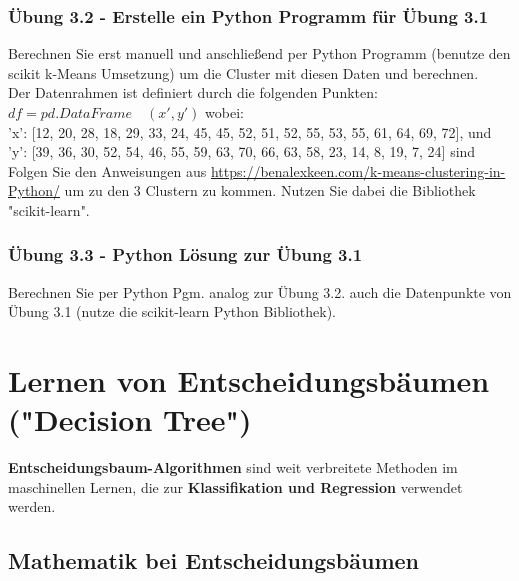 \documentclass[12pt]{article}
\begin{document}
\subsubsection{Übung 3.2 - Erstelle ein Python Programm für Übung 3.1}
Berechnen Sie erst manuell und anschließend per Python Programm (benutze den scikit k-Means Umsetzung) um die Cluster mit diesen Daten und berechnen. \\
Der Datenrahmen ist definiert durch die folgenden Punkten: \\
%
$ df = pd.DataFrame\quad(x', y') $ wobei:\\
'x': [12, 20, 28, 18, 29, 33, 24, 45, 45, 52, 51, 52, 55, 53, 55, 61, 64, 69, 72], und \\
'y': [39, 36, 30, 52, 54, 46, 55, 59, 63, 70, 66, 63, 58, 23, 14, 8, 19, 7, 24] sind \\[0.2cm]
Folgen Sie den Anweisungen aus \url{https://benalexkeen.com/k-means-clustering-in-Python/} um zu den 3 Clustern zu kommen. Nutzen Sie dabei die Bibliothek "scikit-learn". 

\subsubsection{Übung 3.3 - Python Lösung zur Übung 3.1}
Berechnen Sie per Python Pgm. analog zur Übung 3.2. auch die Datenpunkte von Übung 3.1 (nutze die scikit-learn Python Bibliothek).

\newpage

\section{Lernen von Entscheidungsbäumen ("Decision Tree")\\}


\textbf{Entscheidungsbaum-Algorithmen} sind weit verbreitete Methoden im maschinellen Lernen, die zur \textbf{Klassifikation und Regression} verwendet werden.\\

\subsection{Mathematik bei Entscheidungsbäumen}
\end{document}
